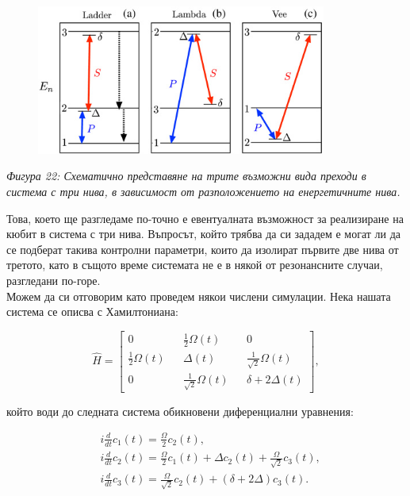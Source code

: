     \begin{figure}[H]
        \centering
        \includegraphics[width=270pt]{20.jpg}
    \end{figure}
    \begin{center}
        \small \textit{Фигура 22: Схематично представяне на трите възможни вида преходи в система с три нива, в зависимост от разположението на енергетичните нива.}\\
    \end{center}

    Това, което ще разгледаме по-точно е евентуалната възможност за реализиране на кюбит в система с три нива. Въпросът, който трябва да си зададем е могат ли да се подберат такива
    контролни параметри, които да изолират първите две нива от третото, като в същото време системата не е в някой от резонансните случаи, разгледани по-горе.\\
    Можем да си отговорим като проведем някои числени симулации. Нека нашата система се описва с Хамилтониана:

    \begin{equation} \label{5.20}
        \hat{H} = \begin{bmatrix}
            0 && \frac{1}{2}\Omega(t) && 0\\
            \frac{1}{2}\Omega(t) && \Delta(t) && \frac{1}{\sqrt{2}}\Omega(t)\\
            0 && \frac{1}{\sqrt{2}}\Omega(t) && \delta +2\Delta(t)
        \end{bmatrix},
    \end{equation}
    
    който води до следната система обикновени диференциални уравнения:

    \begin{subequations} \label{5.21}
        \begin{align}
            & \textit{i}\frac{d}{dt}c_1(t) = \frac{\Omega}{2}c_2(t),\\
            & \textit{i}\frac{d}{dt}c_2(t) = \frac{\Omega}{2}c_1(t) + \Delta c_2(t) + \frac{\Omega}{\sqrt{2}} c_3(t),\\
            & \textit{i}\frac{d}{dt}c_3(t) = \frac{\Omega}{\sqrt{2}} c_2(t) + (\delta + 2\Delta) c_3(t).
        \end{align}
    \end{subequations}

